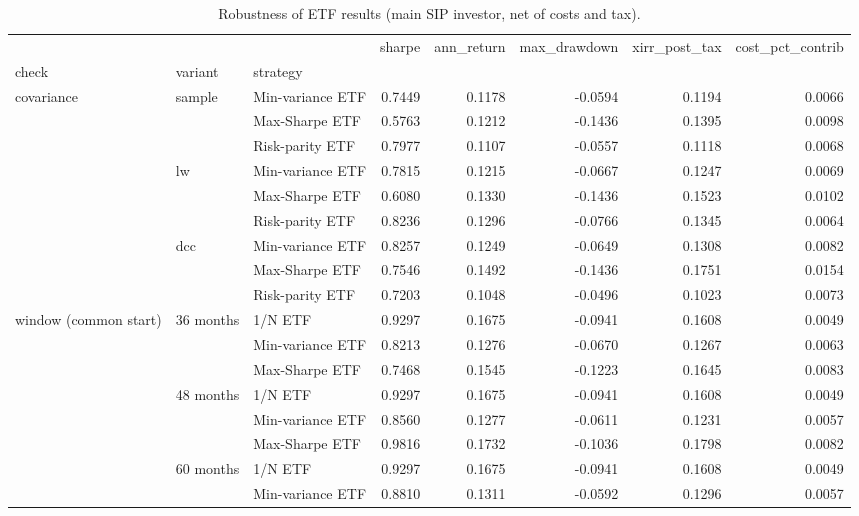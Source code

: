 \begin{table}
\caption{Robustness of ETF results (main SIP investor, net of costs and tax).}
\label{tab:T14_robustness}
\begin{tabular}{lllrrrrr}
\toprule
 &  &  & sharpe & ann\_return & max\_drawdown & xirr\_post\_tax & cost\_pct\_contrib \\
check & variant & strategy &  &  &  &  &  \\
\midrule
\multirow[t]{9}{*}{covariance} & \multirow[t]{3}{*}{sample} & Min-variance ETF & 0.7449 & 0.1178 & -0.0594 & 0.1194 & 0.0066 \\
 &  & Max-Sharpe ETF & 0.5763 & 0.1212 & -0.1436 & 0.1395 & 0.0098 \\
 &  & Risk-parity ETF & 0.7977 & 0.1107 & -0.0557 & 0.1118 & 0.0068 \\
\cline{2-8}
 & \multirow[t]{3}{*}{lw} & Min-variance ETF & 0.7815 & 0.1215 & -0.0667 & 0.1247 & 0.0069 \\
 &  & Max-Sharpe ETF & 0.6080 & 0.1330 & -0.1436 & 0.1523 & 0.0102 \\
 &  & Risk-parity ETF & 0.8236 & 0.1296 & -0.0766 & 0.1345 & 0.0064 \\
\cline{2-8}
 & \multirow[t]{3}{*}{dcc} & Min-variance ETF & 0.8257 & 0.1249 & -0.0649 & 0.1308 & 0.0082 \\
 &  & Max-Sharpe ETF & 0.7546 & 0.1492 & -0.1436 & 0.1751 & 0.0154 \\
 &  & Risk-parity ETF & 0.7203 & 0.1048 & -0.0496 & 0.1023 & 0.0073 \\
\cline{1-8} \cline{2-8}
\multirow[t]{9}{*}{window (common start)} & \multirow[t]{3}{*}{36 months} & 1/N ETF & 0.9297 & 0.1675 & -0.0941 & 0.1608 & 0.0049 \\
 &  & Min-variance ETF & 0.8213 & 0.1276 & -0.0670 & 0.1267 & 0.0063 \\
 &  & Max-Sharpe ETF & 0.7468 & 0.1545 & -0.1223 & 0.1645 & 0.0083 \\
\cline{2-8}
 & \multirow[t]{3}{*}{48 months} & 1/N ETF & 0.9297 & 0.1675 & -0.0941 & 0.1608 & 0.0049 \\
 &  & Min-variance ETF & 0.8560 & 0.1277 & -0.0611 & 0.1231 & 0.0057 \\
 &  & Max-Sharpe ETF & 0.9816 & 0.1732 & -0.1036 & 0.1798 & 0.0082 \\
\cline{2-8}
 & \multirow[t]{3}{*}{60 months} & 1/N ETF & 0.9297 & 0.1675 & -0.0941 & 0.1608 & 0.0049 \\
 &  & Min-variance ETF & 0.8810 & 0.1311 & -0.0592 & 0.1296 & 0.0057 \\

\end{tabular}
\end{table}
